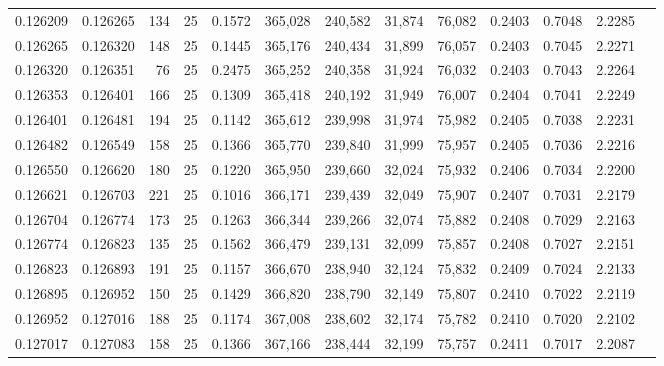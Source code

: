 \begin{tabular}{rrrrrrrrrrrrr}
0.126209 & 0.126265 &   134 &  25 &                                     0.1572 & 365,028 & 240,582 &  31,874 &  76,082 & 0.2403 & 0.7048 & 2.2285 \\
0.126265 & 0.126320 &   148 &  25 &                                     0.1445 & 365,176 & 240,434 &  31,899 &  76,057 & 0.2403 & 0.7045 & 2.2271 \\
0.126320 & 0.126351 &    76 &  25 &                                     0.2475 & 365,252 & 240,358 &  31,924 &  76,032 & 0.2403 & 0.7043 & 2.2264 \\
0.126353 & 0.126401 &   166 &  25 &                                     0.1309 & 365,418 & 240,192 &  31,949 &  76,007 & 0.2404 & 0.7041 & 2.2249 \\
0.126401 & 0.126481 &   194 &  25 &                                     0.1142 & 365,612 & 239,998 &  31,974 &  75,982 & 0.2405 & 0.7038 & 2.2231 \\
0.126482 & 0.126549 &   158 &  25 &                                     0.1366 & 365,770 & 239,840 &  31,999 &  75,957 & 0.2405 & 0.7036 & 2.2216 \\
0.126550 & 0.126620 &   180 &  25 &                                     0.1220 & 365,950 & 239,660 &  32,024 &  75,932 & 0.2406 & 0.7034 & 2.2200 \\
0.126621 & 0.126703 &   221 &  25 &                                     0.1016 & 366,171 & 239,439 &  32,049 &  75,907 & 0.2407 & 0.7031 & 2.2179 \\
0.126704 & 0.126774 &   173 &  25 &                                     0.1263 & 366,344 & 239,266 &  32,074 &  75,882 & 0.2408 & 0.7029 & 2.2163 \\
0.126774 & 0.126823 &   135 &  25 &                                     0.1562 & 366,479 & 239,131 &  32,099 &  75,857 & 0.2408 & 0.7027 & 2.2151 \\
0.126823 & 0.126893 &   191 &  25 &                                     0.1157 & 366,670 & 238,940 &  32,124 &  75,832 & 0.2409 & 0.7024 & 2.2133 \\
0.126895 & 0.126952 &   150 &  25 &                                     0.1429 & 366,820 & 238,790 &  32,149 &  75,807 & 0.2410 & 0.7022 & 2.2119 \\
0.126952 & 0.127016 &   188 &  25 &                                     0.1174 & 367,008 & 238,602 &  32,174 &  75,782 & 0.2410 & 0.7020 & 2.2102 \\
0.127017 & 0.127083 &   158 &  25 &                                     0.1366 & 367,166 & 238,444 &  32,199 &  75,757 & 0.2411 & 0.7017 & 2.2087 \\

\end{tabular}
